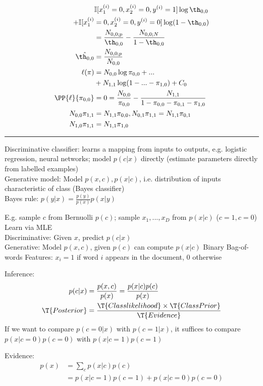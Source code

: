 \documentclass[10pt]{CheatSheet/hw}
\begin{document}
\begin{multicols*}{5}
\begin{align*}
&\mathbb{I}[x_1^{(i)}=0,x_2^{(i)}=0, y^{(i)}=1]\log\th_{0,0}\\
+\mathbb{I}[x_1^{(i)}&=0,x_2^{(i)}=0, y^{(i)}=0]\log(1-\th_{0,0})\\
&=\frac{N_{0,0;p}}{\th_{0,0}}-\frac{N_{0,0;N}}{1-\th_{0,0}}\\
\hat{\th_{0,0}}&=\frac{N_{0,0;p}}{N_{0,0}}\\
\ell(\pi)&=N_{0,0}\log\pi_{0,0}+...\\
&+N_{1,1}\log(1-...-\pi_{1,0})+C_0\\
\PP{\ell}{\pi_{0,0}}&=0=\frac{N_{0,0}}{\pi_{0,0}}-\frac{N_{1,1}}{1-\pi_{0,0}-\pi_{0,1}-\pi_{1,0}}\\
N_{0,0}\pi_{1,1}&=N_{1,1}\pi_{0,0}, N_{0,1}\pi_{1,1}=N_{1,1}\pi_{0,1}\\
N_{1,0}\pi_{1,1}&=N_{1,1}\pi_{1,0}
\end{align*}
\rule{\linewidth}{0.4pt}
Discriminative classifier: learns a mapping from inputs to outputs, e.g. logistic regression, neural networks; model $p(c|x)$ directly (estimate parameters directly from labelled examples)\\
Generative model: Model $p(x,c), p(x|c)$, i.e. distribution of inputs characteristic of class (Bayes classifier)\\
Bayes rule: $p(y|x)=\frac{p(y)}{p(x)}p(x|y)$

E.g. sample $c$ from Bernuolli $p(c)$; sample $x_1,...,x_D$ from $p(x|c)$ ($c=1,c=0$)\\
Learn via MLE\\
Discriminative: Given $x$, predict $p(c|x)$\\
Generative: Model $p(x,c)$, given $p(c)$ can compute $p(x|c)$
Binary Bag-of-words Features: $x_i=1$ if word $i$ appears in the document, 0 otherwise

Inference: \begin{align*}
    p(c|x) &= \frac{p(x,c)}{p(x)} = \frac{p(x|c) p(c)}{p(x)}\\
    \T{Posterior} &= \frac{\T{Class likelihood} \times \T{Class Prior}}{\T{Evidence}}
\end{align*}
If we want to compare $p(c=0|x)$ with $p(c=1|x)$, it suffices to compare $p(x|c=0)p(c=0)$ with $p(x|c=1)p(c=1)$

Evidence: \begin{align*}
    p(x) &=\textstyle\sum_c p(x|c)p(c)\\
    &= p(x|c=1)p(c=1)+p(x|c=0)p(c=0)
\end{align*}


\end{multicols*}
\end{document}
